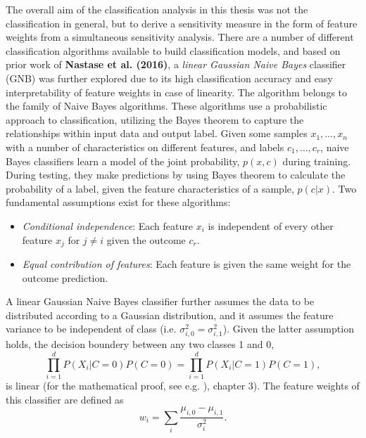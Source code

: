 \documentclass[a4paper, 12pt]{scrreprt}
\begin{document}
The overall aim of the classification analysis in this thesis was not the classification in general, but to derive a sensitivity measure in the form of feature weights from a simultaneous sensitivity analysis. There are a number of different classification algorithms available to build classification models, and based on prior work of \textbf{Nastase et al. (2016)}, a \textit{linear Gaussian Naive Bayes} classifier (GNB) was further explored due to its high classification accuracy and easy interpretability of feature weights in case of linearity. \newline
The algorithm belongs to the family of Naive Bayes algorithms. These algorithms use a probabilistic approach to classification, utilizing the Bayes theorem to capture the relationships within input data and output label. Given some samples $x_1, \ldots, x_n$ with a number of characteristics on different features, and labels $c_1, \ldots, c_r$, naive Bayes classifiers learn a model of the joint probability, $p(x, c)$ during training. During testing, they make predictions by using Bayes theorem to calculate the probability of a label, given the feature characteristics of a sample, $p(c|x)$. Two fundamental assumptions exist for these algorithms: \newline 
\begin{itemize}
	\item \textit{Conditional independence}: Each feature $x_i$ is independent of every other feature $x_j$ for $j \neq i$ given the outcome $c_r$.
	\item \textit{Equal contribution of features}:  Each feature is given the same weight for the outcome prediction. 
\end{itemize} 
A linear Gaussian Naive Bayes classifier further assumes the data to be distributed according to a Gaussian distribution, and it assumes the feature variance to be independent of class (i.e. $\sigma_{i, 0}^2 = \sigma_{i, 1}^2$). Given the latter assumption holds, the decision boundery between any two classes 1 and 0,
\begin{equation}
\prod_{i=1}^{d} P(X_i |C = 0)P(C=0) = \prod_{i=1}^{d} P(X_i |C = 1)P(C=1),
\end{equation}
is linear (for the mathematical proof, see e.g. \textcite{DBLP:books/daglib/0087929}), chapter 3). The feature weights of this classifier are defined as
\begin{equation}
w_i = \sum_{i}\frac{\mu_{i, 0}-\mu_{i, 1}}{\sigma_{i}^{2}}.
\end{equation}
\end{document}
